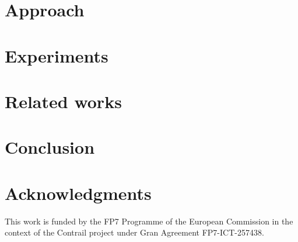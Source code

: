 \documentclass{sig-alternate-10pt}
\begin{document}
%


%


\section{Approach \label{approach}}




\section{Experiments}



\section{Related works}



\section{Conclusion}



\section{Acknowledgments}
This work is funded by the FP7 Programme of the European Commission in the context of the Contrail project under Gran Agreement FP7-ICT-257438.

\balancecolumns

%
%
\end{document}
